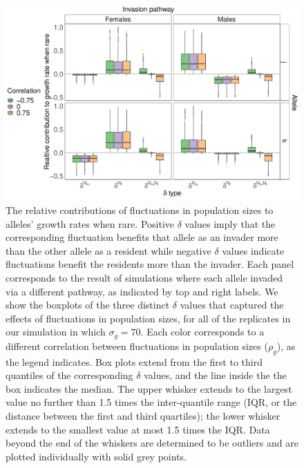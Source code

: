 \documentclass[12pt]{article}
\begin{document}
\begin{figure}[H]
  \centerline{\includegraphics[width=1\textwidth]{box_plots.pdf}}
  \caption{The relative contributions of fluctuations in population sizes to alleles' growth rates when rare. Positive $\delta$ values imply that the corresponding fluctuation benefits that allele as an invader more than the other allele as a resident while negative $\delta$ values indicate fluctuations benefit the residents more than the invader. Each panel corresponds to the result of simulations where each allele invaded via a different pathway, as indicated by top and right labels. We show the boxplots of the three distinct $\delta$ values that captured the effects of fluctuations in population sizes, for all of the replicates in our simulation in which $\sigma_{g}=70$. Each color corresponds to a different correlation between fluctuations in population sizes ($\rho_{g}$), as the legend indicates. Box plots extend from the first to third quantiles of the corresponding $\delta$ values, and the line inside the the box indicates the median. The upper whisker extends to the largest value no further than 1.5 times the inter-quantile range (IQR, or the distance between the first and third quartiles); the lower whisker extends to the smallest value at most 1.5 times the IQR. Data beyond the end of the whiskers are determined to be outliers and are plotted individually with solid grey points. }
    \label{fig:boxes}
\end{figure}
\end{document}

